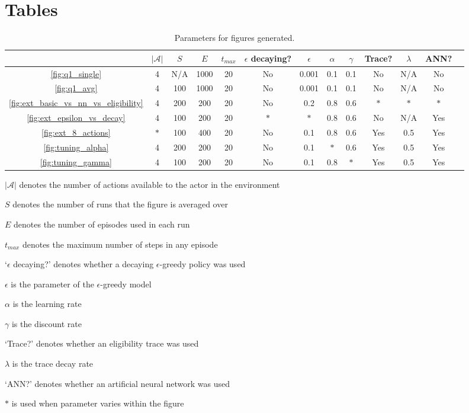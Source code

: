 \documentclass[a4paper, 11pt, twocolumn, final]{article} %
\begin{document}
\onecolumn \appendix

\section{Tables}
\begin{table}[H]
  \centering
  \begin{tabular}{c | c c c c c c c c c c c c}
    \hline
    & $|\mathcal{A}|$ & $S$ & $E$ & $t_{max}$ & $\epsilon$ decaying? &
      $\epsilon$ & $\alpha$ & $\gamma$ & Trace? & $\lambda$ & ANN? \\
    \hline
    \autoref{fig:q1_single} & 4 & N/A & 1000 & 20 & No & 0.001 & 0.1 & 0.1 &
      No & N/A & No \\
    \autoref{fig:q1_avg} & 4 & 100 & 1000 & 20 & No & 0.001 & 0.1 & 0.1 & No &
      N/A & No \\
    \autoref{fig:ext_basic_vs_nn_vs_eligibility} & 4 & 200 & 200 & 20 & No &
      0.2 & 0.8 & 0.6 & $*$ & $*$ & $*$ \\
    \autoref{fig:ext_epsilon_vs_decay} & 4 & 100 & 200 & 20 & $*$ & $*$ & 0.8 &
      0.6 & No & N/A & Yes \\
    \autoref{fig:ext_8_actions} & $*$ & 100 & 400 & 20 & No & 0.1 & 0.8 & 0.6
      & Yes & 0.5 & Yes \\
    \autoref{fig:tuning_alpha} & 4 & 200 & 200 & 20 & No & 0.1 & $*$ & 0.6 &
      Yes & 0.5 & Yes \\
    \autoref{fig:tuning_gamma} & 4 & 100 & 200 & 20 & No & 0.1 & 0.8 & $*$ &
      Yes & 0.5 & Yes \\
    \hline
  \end{tabular}
  \caption{Parameters for figures generated.}
  \label{tab:parameters}
\end{table}

\begin{itemize*}
  \item $|\mathcal{A}|$ denotes the number of actions available to the actor in
    the environment
  \item $S$ denotes the number of runs that the figure is averaged over
  \item $E$ denotes the number of episodes used in each run
  \item $t_{max}$ denotes the maximum number of steps in any episode
  \item `$\epsilon$ decaying?' denotes whether a decaying $\epsilon$-greedy
    policy was used
  \item $\epsilon$ is the parameter of the $\epsilon$-greedy model
  \item $\alpha$ is the learning rate
  \item $\gamma$ is the discount rate
  \item `Trace?' denotes whether an eligibility trace was used
  \item $\lambda$ is the trace decay rate
  \item `ANN?' denotes whether an artificial neural network was used
  \item $*$ is used when parameter varies within the figure
\end{itemize*}
\end{document}
